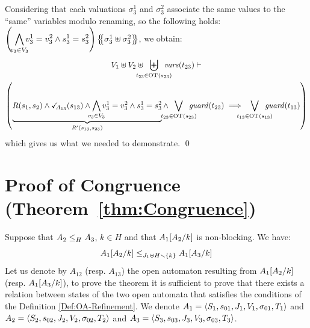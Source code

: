 \documentclass[runningheads]{llncs}
\begin{document}
Considering that each valuations $\sigma_{3}^1$ and $\sigma_{3}^2$ associate the same values to the ``same'' variables modulo renaming, so the following holds:\\ $\left(\,\,{\displaystyle \bigwedge_\subbox{v_3\in V_3} v^1_3=v^2_3\wedge s^1_3 = s^2_3}\right)\psubst{\sigma_{3}^1 \uplus \sigma_{3}^2 }$, we obtain:
\begin{multline*}
V_1 \uplus V_2 \uplus \biguplus_\subbox{t_{23} \in \fOT{s_{23}}} \fvars{t_{23}} \vdash\\ \left(\underbrace{R\mpar{s_1, s_2} \wedge \reach{A_{13}}\mpar{s_{13}} \wedge \bigwedge_\subbox{v_3\in V_3}  v^1_3=v^2_3\wedge s^1_3=s^2_3}_{R^{\prime}(s_{13},s_{23})}  \wedge \bigvee_\subbox{t_{23} \in \fOT{s_{23}}} \fguard{t_{23}}   \implies \bigvee_\subbox{t_{13} \in \fOT{s_{13}}} \fguard{t_{13}}\right)
\end{multline*}
which gives us what we needed to demonstrate. \qed


\section{Proof of Congruence (Theorem~\ref{thm:Congruence})}

Suppose that $\wrel{A_2}{A_3}{H}$, \(k \in H\) and that \(A_1\subst{A_2}{k}\) is non-blocking.
We have: \[\wrel{A_1\subst{A_2}{k}}{A_1\subst{A_3}{k}}{J_1 \uplus H \setminus \mbrc{k}}\]
\proof
Let us denote by $A_{12}$ (resp. $A_{13}$) the open automaton resulting from $A_1\subst{A_2}{k}$ (resp. $A_1\subst{A_3}{k}$),  to prove the theorem it is sufficient to prove that there exists a relation between states of the two open automata that satisfies the conditions of the Definition \ref{Def:OA-Refinement}. We denote $A_1=  \OA{S_1}{s_{01}}{J_1}{V_1}{\sigma_{01}}{T_1}$ and \(A_2 = \OA{S_2}{s_{02}}{J_2}{V_2}{\sigma_{02}}{T_2}\) and $A_3 = \OA{S_3}{s_{03}}{J_3}{V_3}{\sigma_{03}}{T_3}$.

\end{document}
